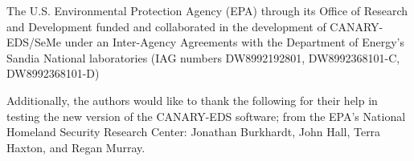 The U.S. Environmental Protection Agency (EPA) through its Office of Research and Development
funded and collaborated in the development of CANARY-EDS/SeMe under an Inter-Agency Agreements
with the Department of Energy's Sandia National laboratories 
(IAG numbers DW8992192801, DW8992368101-C, DW8992368101-D)

Additionally, the authors would like to thank the following for their help in testing 
the new version of the CANARY-EDS software; from the EPA's National Homeland Security
Research Center: Jonathan Burkhardt, John Hall, Terra Haxton, and Regan Murray.
